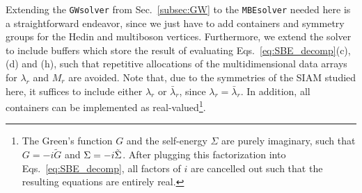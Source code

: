 \documentclass{SciPost}
\begin{document}
Extending the \texttt{GWsolver} from Sec.~\ref{subsec:GW} to the \texttt{MBEsolver} needed here is a straightforward endeavor, since we just have to add containers and symmetry groups for the Hedin and multiboson vertices. Furthermore, we extend the solver to include buffers which store the result of evaluating Eqs.~\eqref{eq:SBE_decomp}(c), (d) and (h), such that repetitive allocations of the multidimensional data arrays for $\lambda_r$ and $M_r$ are avoided. Note that, due to the symmetries of the SIAM studied here, it suffices to include either $\lambda_r$ or $\bar{\lambda}_r$, since $\lambda_r = \bar{\lambda}_r$. In addition, all containers can be implemented as real-valued\footnote{ The Green's function $G$ and the self-energy $\Sigma$ are purely imaginary, such that $G = -i \tilde{G}$ and $\Sigma = -i \Tilde{\Sigma}$. After plugging this factorization into Eqs.~\eqref{eq:SBE_decomp}, all factors of $i$ are cancelled out such that the resulting equations are entirely real.}.
%
\end{document}

